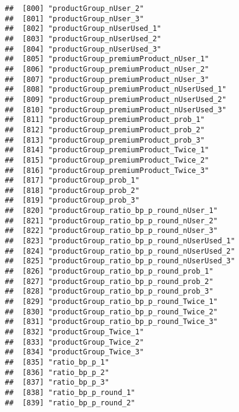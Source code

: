 \documentclass[10pt]{report}
\begin{document}
\begin{verbatim}
##  [800] "productGroup_nUser_2"                                 
##  [801] "productGroup_nUser_3"                                 
##  [802] "productGroup_nUserUsed_1"                             
##  [803] "productGroup_nUserUsed_2"                             
##  [804] "productGroup_nUserUsed_3"                             
##  [805] "productGroup_premiumProduct_nUser_1"                  
##  [806] "productGroup_premiumProduct_nUser_2"                  
##  [807] "productGroup_premiumProduct_nUser_3"                  
##  [808] "productGroup_premiumProduct_nUserUsed_1"              
##  [809] "productGroup_premiumProduct_nUserUsed_2"              
##  [810] "productGroup_premiumProduct_nUserUsed_3"              
##  [811] "productGroup_premiumProduct_prob_1"                   
##  [812] "productGroup_premiumProduct_prob_2"                   
##  [813] "productGroup_premiumProduct_prob_3"                   
##  [814] "productGroup_premiumProduct_Twice_1"                  
##  [815] "productGroup_premiumProduct_Twice_2"                  
##  [816] "productGroup_premiumProduct_Twice_3"                  
##  [817] "productGroup_prob_1"                                  
##  [818] "productGroup_prob_2"                                  
##  [819] "productGroup_prob_3"                                  
##  [820] "productGroup_ratio_bp_p_round_nUser_1"                
##  [821] "productGroup_ratio_bp_p_round_nUser_2"                
##  [822] "productGroup_ratio_bp_p_round_nUser_3"                
##  [823] "productGroup_ratio_bp_p_round_nUserUsed_1"            
##  [824] "productGroup_ratio_bp_p_round_nUserUsed_2"            
##  [825] "productGroup_ratio_bp_p_round_nUserUsed_3"            
##  [826] "productGroup_ratio_bp_p_round_prob_1"                 
##  [827] "productGroup_ratio_bp_p_round_prob_2"                 
##  [828] "productGroup_ratio_bp_p_round_prob_3"                 
##  [829] "productGroup_ratio_bp_p_round_Twice_1"                
##  [830] "productGroup_ratio_bp_p_round_Twice_2"                
##  [831] "productGroup_ratio_bp_p_round_Twice_3"                
##  [832] "productGroup_Twice_1"                                 
##  [833] "productGroup_Twice_2"                                 
##  [834] "productGroup_Twice_3"                                 
##  [835] "ratio_bp_p_1"                                         
##  [836] "ratio_bp_p_2"                                         
##  [837] "ratio_bp_p_3"                                         
##  [838] "ratio_bp_p_round_1"                                   
##  [839] "ratio_bp_p_round_2"                                   

\end{verbatim}
\end{document}

